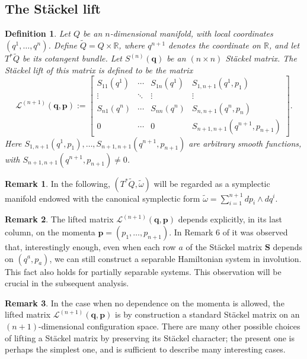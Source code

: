 \documentclass[10pt]{amsart}
\numberwithin{equation}{section}
\newcommand{\bs}{\boldsymbol}
\newtheorem{definition}{Definition}
\theoremstyle{definition}
\newtheorem{remark}{\textbf{Remark}}
\begin{document}
	\subsection{The St\"ackel lift}\label{sec:3.3}

	\begin{definition} Let $Q$ be an $n$-dimensional manifold, with local coordinates $(q^{1},\ldots,q^{n})$. Define $\tilde{Q}= Q\times\mathbb{R}$, where $q^{n+1}$ denotes the coordinate on $\mathbb{R}$, and let $T^{*}\tilde{Q}$ be its cotangent bundle.
		Let $S^{(n)}(\bs{q})$ be an $(n\times n)$ St\"ackel matrix.
		The Stäckel lift of this matrix is defined to be the matrix
		\begin{equation} \label{eq:LSM}
			\mathcal{L}^{(n+1)}(\bs{q}, \bs{p}):= \left[\begin{array}{ccc|ccc}
				S_{11}(q^1)& \cdots & S_{1n}(q^1) & S_{1,n+1}(q^1,p_1) \\ 
				\vdots &\ddots & \vdots & \vdots \\
				S_{n1}(q^n) & \cdots & S_{nn}(q^n) &S_{n,n+1}(q^n,p_n)\\ \hline
				0 & \cdots & 0 & S_{n+1,n+1}(q^{n+1},p_{n+1})
			\end{array}\right].
		\end{equation}
		Here $S_{1,n+1}(q^{1},p_1),\ldots,S_{n+1,n+1}(q^{n+1},p_{n+1})$ are arbitrary smooth functions, with $S_{n+1,n+1}(q^{n+1},p_{n+1})\neq 0$. 
	\end{definition}
	\begin{remark}
	In the following, $(T^{*}\tilde{Q}, \tilde{\omega})$ will be regarded as a symplectic manifold endowed with the canonical symplectic form $\tilde{\omega}= \sum_{i=1}^{n+1} dp_i\wedge dq^i$.
	\end{remark}
	\begin{remark}
		The lifted matrix $\mathcal{L}^{(n+1)}(\bs{q}, \bs{p})$ depends explicitly, in its last column, on the momenta $\bs{p}=(p_1,\ldots,p_{n+1})$. In Remark 6 of \cite{RTT2024AMPA} it was observed that, interestingly enough, even when each row $a$ of the Stäckel matrix $\boldsymbol{S}$ depends on $(q^a, p_a)$, we can still construct a separable Hamiltonian system in involution. This fact also holds for partially separable systems. This observation will be crucial in the subsequent analysis.
	\end{remark}
	
	\begin{remark}
		In the case when no dependence on the momenta is allowed, the lifted matrix $\mathcal{L}^{(n+1)}(\bs{q}, \bs{p})$ is by construction a standard St\"ackel matrix on an $(n+1)$-dimensional configuration space. There are many other possible choices of lifting a St\"ackel matrix by preserving its St\"ackel character; the present one is perhaps the simplest one, and is sufficient to describe many interesting cases.
	\end{remark}
	
\end{document}
